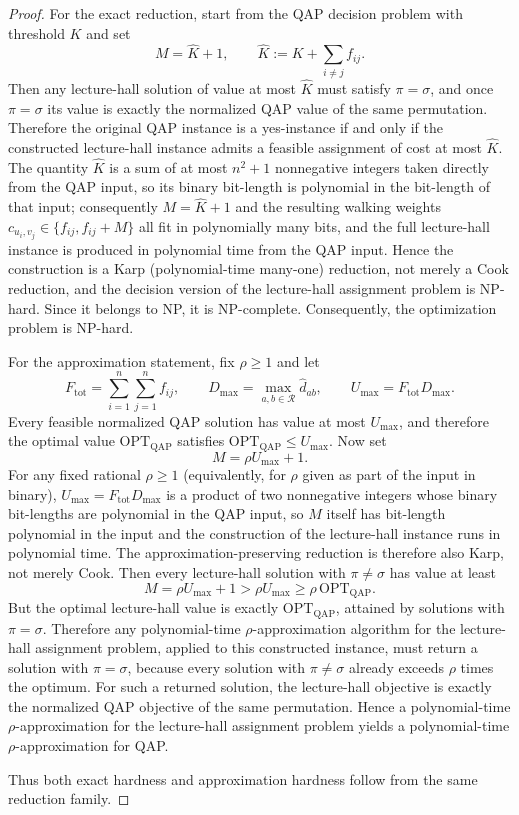 \documentclass[11pt]{article}
\begin{document}
\begin{proof}
For the exact reduction, start from the QAP decision problem with threshold $K$ and set
\[
M = \hat K + 1, \qquad \hat K := K + \sum_{i\neq j} f_{ij}.
\]
Then any lecture-hall solution of value at most $\hat K$ must satisfy $\pi=\sigma$, and once $\pi=\sigma$ its value is exactly the normalized QAP value of the same permutation. Therefore the original QAP instance is a yes-instance if and only if the constructed lecture-hall instance admits a feasible assignment of cost at most $\hat K$. The quantity $\hat K$ is a sum of at most $n^2+1$ nonnegative integers taken directly from the QAP input, so its binary bit-length is polynomial in the bit-length of that input; consequently $M=\hat K+1$ and the resulting walking weights $c_{u_i,v_j}\in\{f_{ij},f_{ij}+M\}$ all fit in polynomially many bits, and the full lecture-hall instance is produced in polynomial time from the QAP input. Hence the construction is a Karp (polynomial-time many-one) reduction, not merely a Cook reduction, and the decision version of the lecture-hall assignment problem is NP-hard. Since it belongs to NP, it is NP-complete. Consequently, the optimization problem is NP-hard.

For the approximation statement, fix $\rho \ge 1$ and let
\[
F_{\mathrm{tot}}=\sum_{i=1}^n \sum_{j=1}^n f_{ij},
\qquad
D_{\max}=\max_{a,b\in \mathcal{R}}\hat d_{ab},
\qquad
U_{\max}=F_{\mathrm{tot}}D_{\max}.
\]
Every feasible normalized QAP solution has value at most $U_{\max}$, and therefore the optimal value $\mathrm{OPT}_{\mathrm{QAP}}$ satisfies $\mathrm{OPT}_{\mathrm{QAP}}\le U_{\max}$. Now set
\[
M=\rho U_{\max}+1.
\]
For any fixed rational $\rho\ge 1$ (equivalently, for $\rho$ given as part of the input in binary), $U_{\max}=F_{\mathrm{tot}} D_{\max}$ is a product of two nonnegative integers whose binary bit-lengths are polynomial in the QAP input, so $M$ itself has bit-length polynomial in the input and the construction of the lecture-hall instance runs in polynomial time. The approximation-preserving reduction is therefore also Karp, not merely Cook. Then every lecture-hall solution with $\pi\neq \sigma$ has value at least
\[
M=\rho U_{\max}+1 > \rho U_{\max}\ge \rho\,\mathrm{OPT}_{\mathrm{QAP}}.
\]
But the optimal lecture-hall value is exactly $\mathrm{OPT}_{\mathrm{QAP}}$, attained by solutions with $\pi=\sigma$. Therefore any polynomial-time $\rho$-approximation algorithm for the lecture-hall assignment problem, applied to this constructed instance, must return a solution with $\pi=\sigma$, because every solution with $\pi\neq \sigma$ already exceeds $\rho$ times the optimum. For such a returned solution, the lecture-hall objective is exactly the normalized QAP objective of the same permutation. Hence a polynomial-time $\rho$-approximation for the lecture-hall assignment problem yields a polynomial-time $\rho$-approximation for QAP.

Thus both exact hardness and approximation hardness follow from the same reduction family.
\end{proof}
\end{document}
